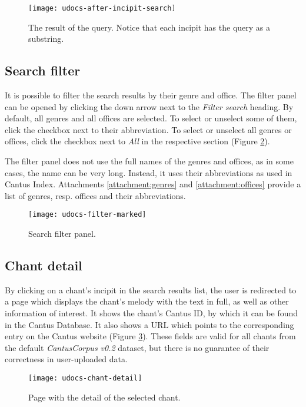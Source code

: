 \begin{figure}[!h]
\centering
\texttt{[image: udocs-after-incipit-search]}
\caption{The result of the query. Notice that each incipit has the query as a substring.}
\label{fig:inc-search-result}
\end{figure}

\subsection{Search filter}

It is possible to filter the search results by their genre and office. The filter panel can be opened by clicking the down arrow next to the \emph{Filter search}
heading. By default, all genres and all offices are selected. To select or unselect some of them, click the checkbox next to their abbreviation. To select 
or unselect all genres or offices, click the checkbox next to \emph{All} in the respective section (Figure \ref{fig:search_filter}).

The filter panel does not use the full names of the genres and offices, as in some cases, the name can be very long. Instead, it uses their abbreviations as used 
in Cantus Index. Attachments \ref{attachment:genres} and \ref{attachment:offices} provide a list of genres, resp. offices and their abbreviations.

\begin{figure}[!h]
\centering
\texttt{[image: udocs-filter-marked]}
\caption{Search filter panel.}
\label{fig:search_filter}
\end{figure}

\subsection{Chant detail}

By clicking on a chant's incipit in the search results list, the user is redirected to a page which displays the chant's melody with the text in full,
as well as other information of interest. It shows the chant's Cantus ID, by which it can be found in the Cantus Database. It also shows a URL which
points to the corresponding entry on the Cantus website (Figure \ref{fig:chant-detail}). These fields are valid for all chants from the default
\emph{CantusCorpus v0.2} dataset, but there is no guarantee of their correctness in user-uploaded data.

\begin{figure}[!h]
\centering
\texttt{[image: udocs-chant-detail]}
\caption{Page with the detail of the selected chant.}
\label{fig:chant-detail}
\end{figure}

